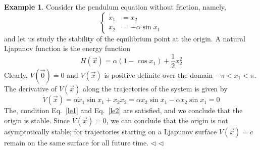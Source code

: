 \documentclass[11pt,a4paper,oneside]{book}
\numberwithin{equation}{section}
\theoremstyle{it}
\theoremstyle{definition}
\newtheorem{example}{Example}[chapter]
\begin{document}
\begin{example}
	Consider the pendulum equation without friction, namely,
	\begin{equation*}
		\left\lbrace \begin{aligned}
			\dot{x}_1 &=  x_2 \\[6pt] 
			\dot{x}_2 &= -\alpha\sin x_1
		\end{aligned}\right. 
	\end{equation*}
	and let us study the stability of the equilibrium point at the origin. A 
	natural Ljapunov function is the energy function 
	\begin{equation*}
		H(\vec{x}) = \alpha(1-\cos x_1) + \frac{1}{2}x_2^2 
	\end{equation*}
	Clearly, $V(\vec{0})=0$ and $V(\vec{x})$ is positive definite over the 
	domain $-\pi<x_1<\pi$. The derivative of $V(\vec{x})$ along the 
	trajectories of the system is given by
	\begin{equation*}
		\dot{V}(\vec{x})=\alpha\dot{x}_1\sin x_1+x_2\dot{x}_2 = \alpha x_2\sin 
		x_1-\alpha x_2\sin x_1=0
	\end{equation*}
	The, condition Eq.~\eqref{le1} and Eq.~\eqref{le2} are satisfied, and we 
	conclude that the origin is stable. Since $\dot{V}(\vec{x})=0$, we can 
	conclude that the origin is not asymptotically stable; for trajectories 
	starting on a Ljapunov surface $V(\vec{x})=c$ remain on the same surface 
	for all future time. 
	$\triangleleft$
$\triangleleft$ \end{example}
\end{document}
